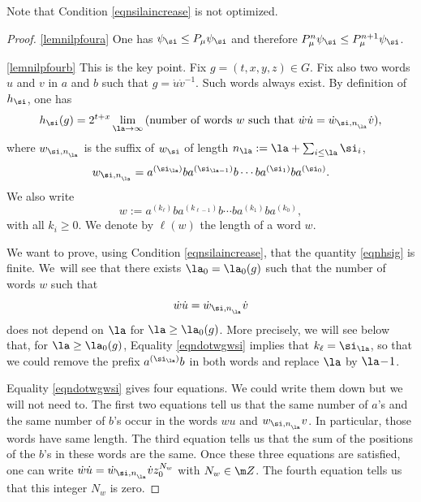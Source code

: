 Note that Condition \eqref{eqnsilaincrease} is not optimized.

\skpt
\begin{proof}
\eqref{lemnilpfoura} One has $\psi_\si\leq P_\mu\psi_\si$ and therefore $P_\mu^n\psi_\si\leq P_\mu^{n+1}\psi_\si$.

\eqref{lemnilpfourb} This is the key point.
Fix $g=(t,x,y,z)\in G$.
Fix also two words $u$ and $v$ in $a$ and $b$
such that $g=\dot{u}\dot{v}^{-1}$. Such words always exist.
By definition of $h_\si$, one has
\begin{equation}
\label{eqnhsig}
h_{\si}(g)=2^{t+x} \lim_{\la\to\infty}
\text{(number of words $w$ such that $\dot{w}\dot{u}=\dot{w}_{\si,n_{_\la}}\dot{v}$),}
\end{equation}
where $w_{\si,n_{_\la}}$ is the suffix of $w_\si$
of length $n_\la:= \la+\sum_{ i\leq \la} \si_i$, \ie
\begin{equation}
\label{eqnwordwsi}
w_{\si,n_{_\la}} = a^{(\si_{\la})}ba^{(\si_{\la-1})}b\cdots ba^{(\si_1)}ba^{(\si_0)}.
\end{equation}
We also write
\begin{equation}
\label{eqnwordw}
w:= a^{(k_{\ell})}ba^{(k_{\ell-1})}b\cdots ba^{(k_1)}ba^{(k_0)},
\end{equation}
with all $k_i\geq 0$. We denote by $\ell(w)$ the length of a word $w$.

We want to prove, using Condition \eqref{eqnsilaincrease}, that the quantity \eqref{eqnhsig} is finite.
We~will see that there exists $\la_0=\la_0(g)$ such that
the number of words $w$ such that
\begin{equation}
\label{eqndotwgwsi}
\dot{w}\dot{u}=\dot{w}_{\si,n_{_\la}}\dot{v}
\end{equation}
does not depend on $\la$ for $\la\geq \la_0(g)$.
More precisely, we will see below that,
for $\la\geq \la_0(g)$,
Equality \eqref{eqndotwgwsi} implies
that $k_\ell=\si_{\la}$, so that we could remove the prefix $a^{(\si_\la)}b$
in both words and replace $\la$ by $\la\! -\! 1$.

Equality \eqref{eqndotwgwsi} gives four equations.
We could write them down but we will not need to.
The first two equations tell us that the same number of $a$'s and the same number of $b$'s
occur in the words $wu$ and $w_{\si,n_{_\la}}v$. In particular, those words have same length.
The third equation tells us that the sum of the positions of the $b$'s in these words
are the same.
Once these three equations are satisfied, one can write
$\dot{w}\dot{u}=\dot{w}_{\si,n_{_\la}}\dot{v} z_0^{N_w}$
with $N_w\in \m Z$.
The fourth equation
tells us that this integer $N_w$ is zero.


\end{proof}
